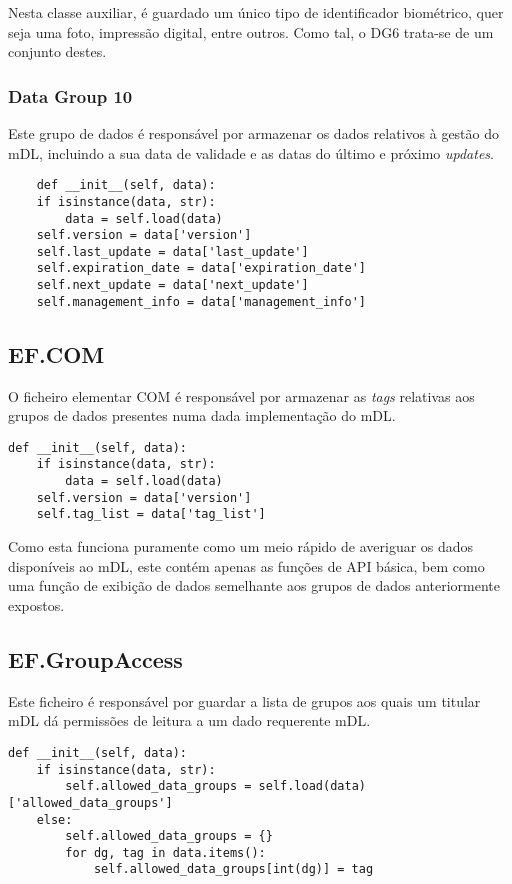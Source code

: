 Nesta classe auxiliar, é guardado um único tipo de identificador biométrico, quer seja uma foto, impressão digital, entre outros. Como tal, o DG6 trata-se de um conjunto destes.

\subsubsection{Data Group 10}

Este grupo de dados é responsável por armazenar os dados relativos à gestão do mDL, incluindo a sua data de validade e as datas do último e próximo \textit{updates}. 

\begin{verbatim}
    def __init__(self, data):
    if isinstance(data, str):
        data = self.load(data)
    self.version = data['version']
    self.last_update = data['last_update']
    self.expiration_date = data['expiration_date']
    self.next_update = data['next_update']
    self.management_info = data['management_info']
\end{verbatim}

\subsection{EF.COM}

O ficheiro elementar COM é responsável por armazenar as \textit{tags} relativas aos grupos de dados presentes numa dada implementação do mDL.

\begin{verbatim}
def __init__(self, data):
    if isinstance(data, str):
        data = self.load(data)
    self.version = data['version']
    self.tag_list = data['tag_list']
\end{verbatim}

Como esta funciona puramente como um meio rápido de averiguar os dados disponíveis ao mDL, este contém apenas as funções de API básica, bem como uma função de exibição de dados semelhante aos grupos de dados anteriormente expostos.


\subsection{EF.GroupAccess}

Este ficheiro é responsável por guardar a lista de grupos aos quais um titular mDL dá permissões de leitura a um dado requerente mDL.

\begin{verbatim}
def __init__(self, data):
    if isinstance(data, str):
        self.allowed_data_groups = self.load(data)['allowed_data_groups']
    else:
        self.allowed_data_groups = {}
        for dg, tag in data.items():
            self.allowed_data_groups[int(dg)] = tag
\end{verbatim}

